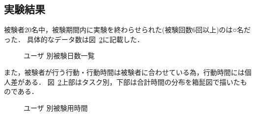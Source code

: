 \subsection{実験結果}
被験者20名中，被験期間内に実験を終わらせられた(被験回数6回以上)のは○名だった．
具体的なデータ数は図~\ref{fig:day}に記載した．
\begin{figure}[hb]
	\begin{center}
		\caption{ユーザ 別被験日数一覧}
		\label{fig:day}
	\end{center}
\end{figure}

また，被験者が行う行動・行動時間は被験者に合わせている為，行動時間には個人差がある．
図~\ref{fig:day}上部はタスク別，下部は合計時間の分布を箱髭図で描いたものである．
\begin{figure}[hb]
	\begin{center}
		\caption{ユーザ 別被験用時間}
		\label{fig:day}
	\end{center}
\end{figure}

